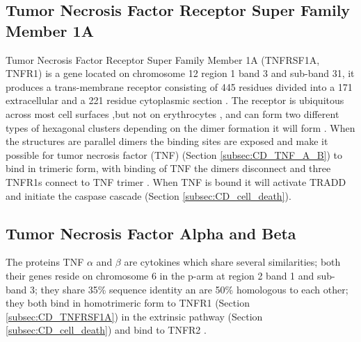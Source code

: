 \subsection{Tumor Necrosis Factor Receptor Super Family Member 1A}
Tumor Necrosis Factor Receptor Super Family Member 1A (TNFRSF1A, TNFR1) is a gene located on chromosome 12 region 1 band 3 and sub-band 31, it produces a trans-membrane receptor consisting of 445 residues divided into a 171 extracellular and a 221 residue cytoplasmic section \cite{}.
The receptor is ubiquitous across most cell surfaces ,but not on erythrocytes \cite{}, and can form two different types of hexagonal clusters depending on the dimer formation it will form \cite{}. 
When the structures are parallel dimers the binding sites are exposed and make it possible for tumor necrosis factor (TNF) (Section \ref{subsec:CD_TNF_A_B}) to bind in trimeric form, with binding of TNF the dimers disconnect and three TNFR1s connect to TNF trimer \cite{}.
When TNF is bound it will activate TRADD \cite{} and initiate the caspase cascade \cite{} (Section \ref{subsec:CD_cell_death}).
\label{subsec:CD_TNFRSF1A}

\subsection{Tumor Necrosis Factor Alpha and Beta}
The proteins TNF $\alpha$ and $\beta$ are cytokines which share several similarities; both their genes reside on chromosome 6 in the p-arm at region 2 band 1 and sub-band 3; they share 35\% sequence identity an are 50\% homologous to each other; they both bind in homotrimeric form to TNFR1 (Section \ref{subsec:CD_TNFRSF1A}) in the extrinsic pathway (Section \ref{subsec:CD_cell_death}) and bind to TNFR2 \cite{}.

\label{subsec:CD_TNF_A_B}
